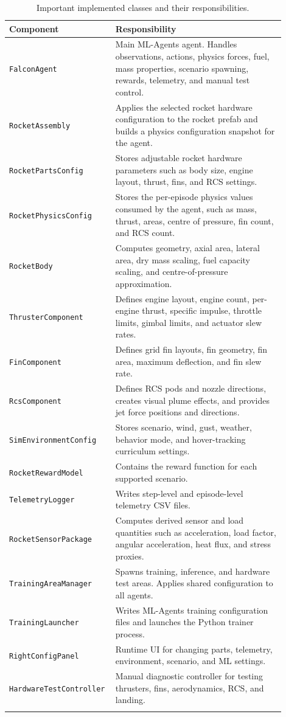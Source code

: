 \documentclass{article}
\begin{document}
\begin{longtable}{p{0.30\linewidth} p{0.60\linewidth}}
\toprule
\textbf{Component} & \textbf{Responsibility} \\
\midrule
\endhead
\texttt{FalconAgent} & Main ML-Agents agent. Handles observations, actions, physics forces, fuel, mass properties, scenario spawning, rewards, telemetry, and manual test control. \\
\texttt{RocketAssembly} & Applies the selected rocket hardware configuration to the rocket prefab and builds a physics configuration snapshot for the agent. \\
\texttt{RocketPartsConfig} & Stores adjustable rocket hardware parameters such as body size, engine layout, thrust, fins, and RCS settings. \\
\texttt{RocketPhysicsConfig} & Stores the per-episode physics values consumed by the agent, such as mass, thrust, areas, centre of pressure, fin count, and RCS count. \\
\texttt{RocketBody} & Computes geometry, axial area, lateral area, dry mass scaling, fuel capacity scaling, and centre-of-pressure approximation. \\
\texttt{ThrusterComponent} & Defines engine layout, engine count, per-engine thrust, specific impulse, throttle limits, gimbal limits, and actuator slew rates. \\
\texttt{FinComponent} & Defines grid fin layouts, fin geometry, fin area, maximum deflection, and fin slew rate. \\
\texttt{RcsComponent} & Defines RCS pods and nozzle directions, creates visual plume effects, and provides jet force positions and directions. \\
\texttt{SimEnvironmentConfig} & Stores scenario, wind, gust, weather, behavior mode, and hover-tracking curriculum settings. \\
\texttt{RocketRewardModel} & Contains the reward function for each supported scenario. \\
\texttt{TelemetryLogger} & Writes step-level and episode-level telemetry CSV files. \\
\texttt{RocketSensorPackage} & Computes derived sensor and load quantities such as acceleration, load factor, angular acceleration, heat flux, and stress proxies. \\
\texttt{TrainingAreaManager} & Spawns training, inference, and hardware test areas. Applies shared configuration to all agents. \\
\texttt{TrainingLauncher} & Writes ML-Agents training configuration files and launches the Python trainer process. \\
\texttt{RightConfigPanel} & Runtime UI for changing parts, telemetry, environment, scenario, and ML settings. \\
\texttt{HardwareTestController} & Manual diagnostic controller for testing thrusters, fins, aerodynamics, RCS, and landing. \\
\bottomrule
\caption{Important implemented classes and their responsibilities.}
\end{longtable}
\end{document}
